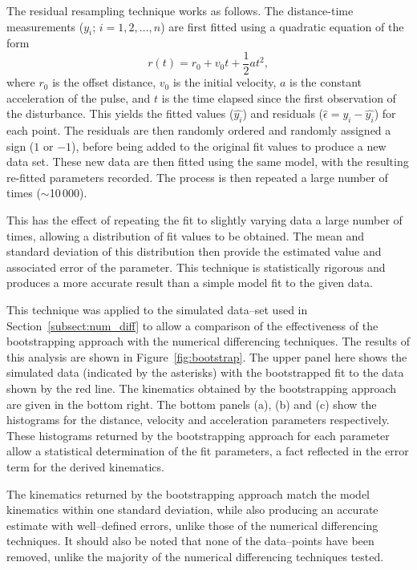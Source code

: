 \documentclass[structabstract]{aa}
\begin{document}
The residual resampling technique works as follows. The distance-time measurements ($y_i$; $i=1, 2, \ldots, n$) are first fitted using a quadratic equation of the form
\begin{equation}
r(t) = r_0 + v_0 t + \frac{1}{2}a t^2,
\end{equation}
where $r_0$ is the offset distance, $v_0$ is the initial velocity, $a$ is the constant acceleration of the pulse, and $t$ is the time elapsed since the first observation of the disturbance. This yields the fitted values ($\hat{y_{i}}$) and residuals ($\hat{\epsilon}=y_{i} - \hat{y_{i}}$) for each point. The residuals are then randomly ordered and randomly assigned a sign ($1$ or $-1$), before being added to the original fit values to produce a new data set. These new data are then fitted using the same model, with the resulting re-fitted parameters recorded. The process is then repeated a large number of times ($\sim$10\,000).

This has the effect of repeating the fit to slightly varying data a large number of times, allowing a distribution of fit values to be obtained. The mean and standard deviation of this distribution then provide the estimated value and associated error of the parameter. This technique is statistically rigorous and produces a more accurate result than a simple model fit to the given data. 

This technique was applied to the simulated data--set used in Section~\ref{subsect:num_diff} to allow a comparison of the effectiveness of the bootstrapping approach with the numerical differencing techniques. The results of this analysis are shown in Figure~\ref{fig:bootstrap}. The upper panel here shows the simulated data (indicated by the asterisks) with the bootstrapped fit to the data shown by the red line. The kinematics obtained by the bootstrapping approach are given in the bottom right. The bottom panels (a), (b) and (c) show the histograms for the distance, velocity and acceleration parameters respectively. These histograms returned by the bootstrapping approach for each parameter allow a statistical determination of the fit parameters, a fact reflected in the error term for the derived kinematics. 

The kinematics returned by the bootstrapping approach match the model kinematics within one standard deviation, while also producing an accurate estimate with well--defined errors, unlike those of the numerical differencing techniques. It should also be noted that none of the data--points have been removed, unlike the majority of the numerical differencing techniques tested. 
\end{document}
